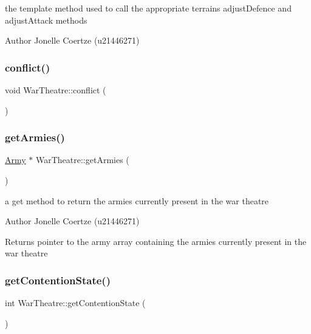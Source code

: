 the template method used to call the appropriate terrain\textquotesingle{}s adjust\+Defence and adjust\+Attack methods 

\begin{DoxyAuthor}{Author}
Jonelle Coertze (u21446271) 
\end{DoxyAuthor}
\mbox{\label{class_war_theatre_a387bd59d6d1cd476764d2e6bfe8dd8df}} 
\subsubsection{\texorpdfstring{conflict()}{conflict()}}
{\footnotesize\ttfamily void War\+Theatre\+::conflict (\begin{DoxyParamCaption}{ }\end{DoxyParamCaption})}

\mbox{\label{class_war_theatre_abddee7212b4e178eaf1923664411b0cb}} 
\subsubsection{\texorpdfstring{getArmies()}{getArmies()}}
{\footnotesize\ttfamily \mbox{\hyperlink{class_army}{Army}} $\ast$ War\+Theatre\+::get\+Armies (\begin{DoxyParamCaption}{ }\end{DoxyParamCaption})}



a get method to return the armies currently present in the war theatre 

\begin{DoxyAuthor}{Author}
Jonelle Coertze (u21446271) 
\end{DoxyAuthor}
\begin{DoxyReturn}{Returns}
pointer to the army array containing the armies currently present in the war theatre 
\end{DoxyReturn}
\mbox{\label{class_war_theatre_ab40e687f758e22fdf56e962df1ce58ee}} 
\subsubsection{\texorpdfstring{getContentionState()}{getContentionState()}}
{\footnotesize\ttfamily int War\+Theatre\+::get\+Contention\+State (\begin{DoxyParamCaption}{ }\end{DoxyParamCaption})}



